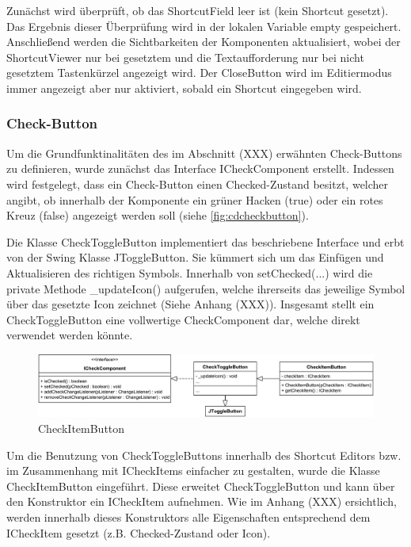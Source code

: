 

Zunächst wird überprüft, ob das ShortcutField leer ist (kein Shortcut gesetzt). Das Ergebnis dieser Überprüfung wird in der lokalen Variable empty gespeichert. Anschließend werden die Sichtbarkeiten der Komponenten aktualisiert, wobei der ShortcutViewer nur bei gesetztem und die Textaufforderung nur bei nicht gesetztem Tastenkürzel angezeigt wird. Der CloseButton wird im Editiermodus immer angezeigt aber nur aktiviert, sobald ein Shortcut eingegeben wird.

\newpage

\subsubsection{Check-Button}

Um die Grundfunktinalitäten des im Abschnitt (XXX) erwähnten Check-Buttons zu definieren, wurde zunächst das Interface ICheckComponent erstellt. Indessen wird festgelegt, dass ein Check-Button einen Checked-Zustand besitzt, welcher angibt, ob innerhalb der Komponente ein grüner Hacken (true) oder ein rotes Kreuz (false) angezeigt werden soll (siehe \autoref{fig:cdcheckbutton}).

Die Klasse CheckToggleButton implementiert das beschriebene Interface und erbt von der Swing Klasse JToggleButton. Sie kümmert sich um das Einfügen und Aktualisieren des richtigen Symbols. Innerhalb von setChecked(...) wird die private Methode \_updateIcon() aufgerufen, welche ihrerseits das jeweilige Symbol über das gesetzte Icon zeichnet (Siehe Anhang (XXX)). Insgesamt stellt ein CheckToggleButton eine vollwertige CheckComponent dar, welche direkt verwendet werden könnte.

\begin{figure}[H]
	\centering
	\includegraphics[width=1\linewidth]{../graphic/diagrams/CD_CheckButton/CD_CheckButton}
	\caption{CheckItemButton}
	\label{fig:cdcheckbutton}
\end{figure}

\vspace{-5px}

Um die Benutzung von CheckToggleButtons innerhalb des Shortcut Editors bzw. im Zusammenhang mit ICheckItems einfacher zu gestalten, wurde die Klasse CheckItemButton eingeführt. Diese erweitet CheckToggleButton und kann über den Konstruktor ein ICheckItem aufnehmen. Wie im Anhang (XXX) ersichtlich, werden innerhalb dieses Konstruktors alle Eigenschaften entsprechend dem ICheckItem gesetzt (z.B. Checked-Zustand oder Icon).

